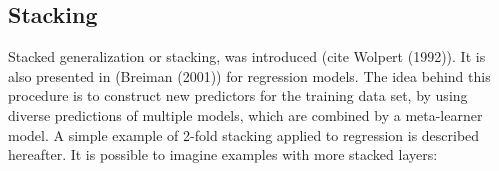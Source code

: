 % 
% 
% 
% 
% 

\subsection{Stacking}
\label{sec:rvflstacking}

Stacked generalization or stacking, was introduced (cite Wolpert (1992)). It is also presented in (Breiman (2001)) for regression models. The idea behind this procedure is to construct new predictors for the training data set, by using diverse predictions of multiple models, which are combined by a meta-learner model. A simple example of 2-fold stacking applied to regression is described hereafter. It is possible to imagine examples with more stacked layers:

